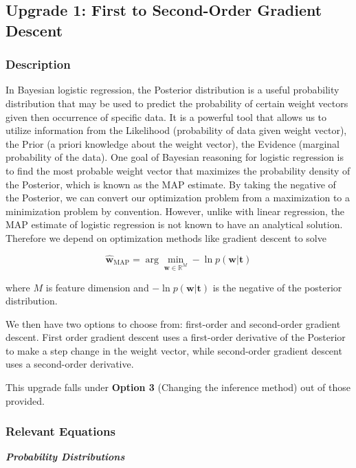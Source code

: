 \documentclass[12pt]{extarticle}
\begin{document}
\subsection{Upgrade 1: First to Second-Order Gradient Descent}

\subsubsection{Description}
In Bayesian logistic regression, the Posterior distribution is a useful probability distribution that may be used to predict the probability of certain weight vectors given then occurrence of specific data. It is a powerful tool that allows us to utilize information from the Likelihood (probability of data given weight vector), the Prior (a priori knowledge about the weight vector), the Evidence (marginal probability of the data). One goal of Bayesian reasoning for logistic regression is to find the most probable weight vector that maximizes the probability density of the Posterior, which is known as the MAP estimate. By taking the negative of the Posterior, we can convert our optimization problem from a maximization to a minimization problem by convention. However, unlike with linear regression, the MAP estimate of logistic regression is not known to have an analytical solution. Therefore we depend on optimization methods like gradient descent to solve

\begin{equation}
\hat{\textbf{w}}_{\mathrm{MAP}} = \arg\min_{\textbf{w} \in \mathbb{R}^M} -\ln p(\textbf{w}|\textbf{t}) 
\end{equation}

where $M$ is feature dimension and $-\ln p(\textbf{w}|\textbf{t})$ is the negative of the posterior distribution.

We then have two options to choose from: first-order and second-order gradient descent. First order gradient descent uses a first-order derivative of the Posterior to make a step change in the weight vector, while second-order gradient descent uses a second-order derivative.

This upgrade falls under \textbf{Option 3} (Changing the inference method) out of those provided.

\subsubsection{Relevant Equations}

\textbf{\textit{Probability Distributions}}
\end{document}

